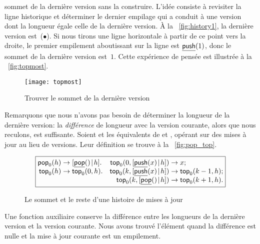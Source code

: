 sommet de la dernière version sans la construire. L'idée consiste à
revisiter la ligne historique et déterminer le dernier empilage qui a
conduit à une version dont la longueur égale celle de la dernière
version. À la \fig~\ref{fig:history1}, la dernière version
est~(\(\bullet\)). Si nous tirons une ligne horizontale à partir de ce
point vers la droite, le premier empilement aboutissant sur la ligne
est \(\underline{\textsf{push}}(1)\), donc le sommet de la dernière version
est~\(1\). Cette expérience de pensée est illustrée à la
\fig~\vref{fig:topmost}.
\begin{figure}[b]
\centering
\texttt{[image: topmost]}
\caption{Trouver le sommet de la dernière version}
\label{fig:topmost}
\end{figure}
Remarquons que nous n'avons pas besoin de déterminer la longueur de la
dernière version: la \emph{différence} de longueur avec la version courante, alors que nous reculons, est suffisante. Soient
 et
 les équivalents de
 et , opérant sur des mises à jour au lieu de versions. Leur définition se trouve à la \fig~\vref{fig:pop_top}.
\begin{figure}[t]
\begin{equation*}
\boxed{%
\begin{array}{@{}r@{\;}l@{\;}lr@{\;}l@{\;}l@{}}
\fun{pop}_0(h)   & \rightarrow          & \cons{\ufun{pop}()}{h}. &
\fun{top}_0(0,\cons{\ufun{push}(x)}{h}) & \rightarrow             & x;\\
\fun{top}_0(h)   & \rightarrow          & \fun{top}_0(0,h).       &
\fun{top}_0(k,\cons{\ufun{push}(x)}{h}) & \rightarrow             & \fun{top}_0(k-1,h);\\
                 & & &
\fun{top}_0(k,\cons{\ufun{pop}()}{h})   & \rightarrow            & \fun{top}_0(k+1,h).
\end{array}}
\end{equation*}
\caption{Le sommet et le reste d'une histoire de mises à jour}
\label{fig:pop_top}
\end{figure}
Une fonction auxiliaire
 conserve la différence
entre les longueurs de la dernière version et la version
courante. Nous avons trouvé l'élément quand la différence est nulle et
la mise à jour courante est un empilement.

